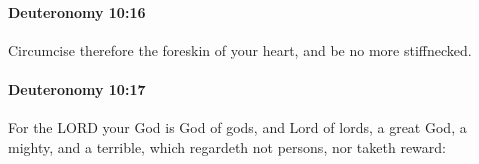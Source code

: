 		\paragraph{Deuteronomy 10:16} %
			\label{DEUTERONOMY-10-16}

			Circumcise therefore the foreskin of your heart, and be no more stiffnecked.


		\paragraph{Deuteronomy 10:17} %
			\label{DEUTERONOMY-10-17}

			For the LORD your God is God of gods, and Lord of lords, a great God, a mighty, and a terrible, which regardeth not persons, nor taketh reward:


